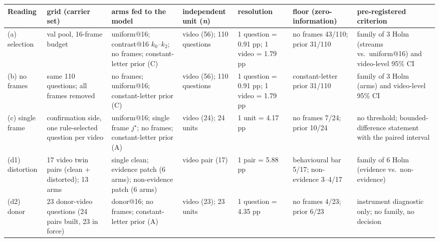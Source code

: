 {\footnotesize
\begin{tabular}{@{}l p{1.02in} p{1.30in} p{0.92in} p{0.92in} p{0.92in} p{0.90in}@{}}
\toprule
Reading & grid (carrier set) & arms fed to the model & independent unit (\textit{n}) & resolution & floor (zero-information) & pre-registered criterion \\
\midrule
(a) selection & val pool, 16-frame budget & uniform@16; contrast@16 $k_0$--$k_2$; no frames; constant-letter prior (C) & video (56); 110 questions & 1 question = 0.91 pp; 1 video = 1.79 pp & no frames 43/110; prior 31/110 & family of 3 Holm (streams vs.\ uniform@16) and video-level 95\% CI \\
(b) no frames & same 110 questions; all frames removed & no frames; uniform@16; constant-letter prior (C) & video (56); 110 questions & 1 question = 0.91 pp; 1 video = 1.79 pp & constant-letter prior 31/110 & family of 3 Holm (arms) and video-level 95\% CI \\
(c) single frame & confirmation side, one rule-selected question per video & uniform@16; single frame $j^\star$; no frames; constant-letter prior (A) & video (24); 24 units & 1 unit = 4.17 pp & no frames 7/24; prior 10/24 & no threshold; bounded-difference statement with the paired interval \\
(d1) distortion & 17 video twin pairs (clean + distorted); 13 arms & single clean; evidence patch (6 arms); non-evidence patch (6 arms) & video pair (17) & 1 pair = 5.88 pp & behavioural bar 5/17; non-evidence 3--4/17 & family of 6 Holm (evidence vs.\ non-evidence) \\
(d2) donor & 23 donor-video questions (24 pairs built, 23 in force) & donor@16; no frames; constant-letter prior (A) & video (23); 23 units & 1 question = 4.35 pp & no frames 4/23; prior 6/23 & instrument diagnostic only; no family, no decision \\
\bottomrule
\end{tabular}
}
